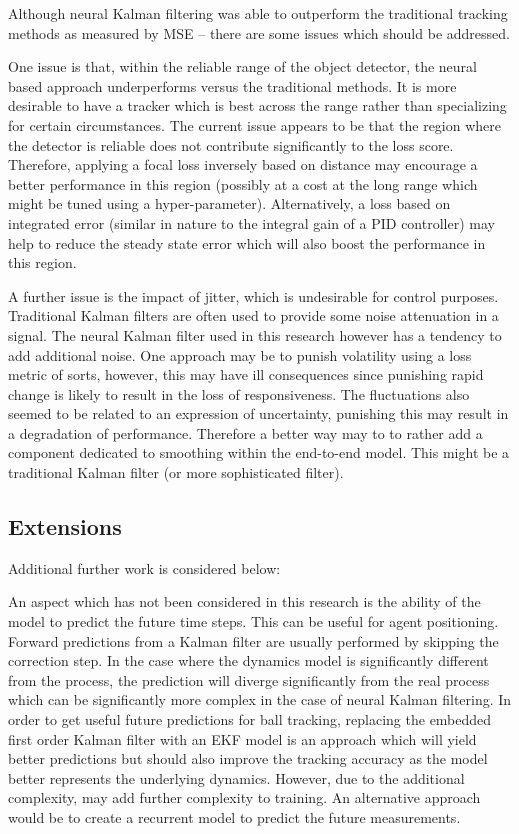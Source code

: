 \documentclass[a4paper,twoside,12pt]{report}
\begin{document}
Although neural Kalman filtering was able to outperform the traditional tracking methods as measured by MSE -- there are some issues which should be addressed. 

One issue is that, within the reliable range of the object detector, the neural based approach underperforms versus the traditional methods. It is more desirable to have a tracker which is best across the range rather than specializing for certain circumstances. The current issue appears to be that the region where the detector is reliable does not contribute significantly to the loss score. Therefore, applying a focal loss inversely based on distance may encourage a better performance in this region (possibly at a cost at the long range which might be tuned using a hyper-parameter). Alternatively, a loss based on integrated error (similar in nature to the integral gain of a PID controller) may help to reduce the steady state error which will also boost the performance in this region.  

A further issue is the impact of jitter, which is undesirable for control purposes. Traditional Kalman filters are often used to provide some noise attenuation in a signal. The neural Kalman filter used in this research however has a tendency to add additional noise. One approach may be to punish volatility using a loss metric of sorts, however, this may have ill consequences since punishing rapid change is likely to result in the loss of responsiveness. The fluctuations also seemed to be related to an expression of uncertainty, punishing this may result in a degradation of performance. Therefore a better way may to to rather add a component dedicated to smoothing within the end-to-end model. This might be a traditional Kalman filter (or more sophisticated filter).

\subsection{Extensions}

Additional further work is considered below:

An aspect which has not been considered in this research is the ability of the model to predict the future time steps. This can be useful for agent positioning. Forward predictions from a Kalman filter are usually performed by skipping the correction step. In the case where the dynamics model is significantly different from the process, the prediction will diverge significantly from the real process which can be significantly more complex in the case of neural Kalman filtering. In order to get useful future predictions for ball tracking, replacing the embedded first order Kalman filter with an EKF model is an approach which will yield better predictions but should also improve the tracking accuracy as the model better represents the underlying dynamics. However, due to the additional complexity, may add further complexity to training. An alternative approach would be to create a recurrent model to predict the future measurements.
\end{document}
